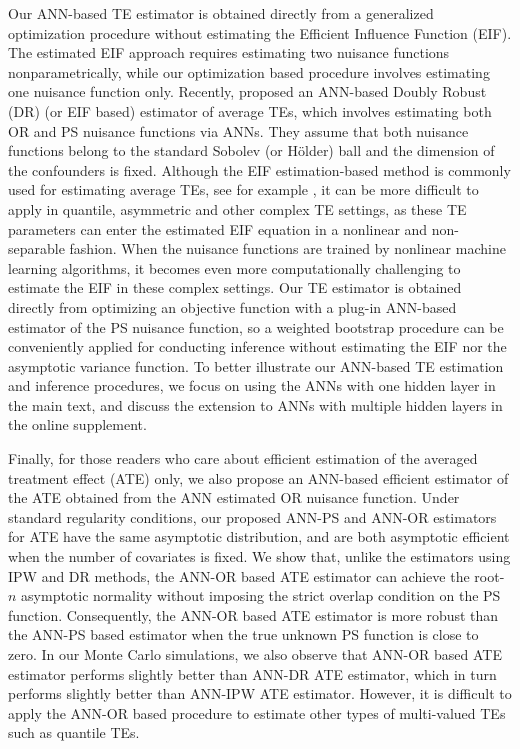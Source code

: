 \documentclass[11pt]{article}
\numberwithin{equation}{section}
\begin{document}
Our ANN-based TE estimator is obtained directly from a generalized optimization procedure without estimating the Efficient Influence Function (EIF). The estimated EIF approach requires estimating two nuisance functions nonparametrically, while our optimization based procedure involves estimating one nuisance function only. Recently, \cite{farrell2018deep} proposed an ANN-based Doubly Robust (DR) (or EIF based) estimator of average TEs, which involves estimating both OR and PS nuisance functions via ANNs. They assume that both nuisance functions belong to the standard Sobolev (or H\"{o}lder) ball and the dimension of the confounders is fixed. Although the EIF estimation-based method is commonly used for estimating average TEs, see for example \cite{CTD09, T10, VR11, RLSR12,KMMS17,chernozhukov2018double}, it can be more difficult to apply in quantile, asymmetric and other complex TE settings, as these TE parameters can enter the estimated EIF equation in a nonlinear and non-separable fashion. When the nuisance functions are trained by nonlinear machine learning algorithms, it becomes even more computationally challenging to estimate the EIF in these complex settings. Our TE estimator is obtained directly from optimizing an objective function with a plug-in ANN-based estimator of the PS nuisance function, so a weighted bootstrap procedure can be conveniently applied for conducting inference without estimating the EIF nor the asymptotic variance function. To better illustrate our ANN-based TE estimation and inference procedures, we focus on using the ANNs with one hidden layer in the main text, and discuss the extension to ANNs with multiple hidden layers in the online supplement.


Finally, for those readers who care about efficient estimation of the averaged treatment effect (ATE) only, we also propose an
ANN-based efficient estimator of the ATE obtained from the ANN estimated OR nuisance function. Under standard regularity conditions, our proposed ANN-PS and ANN-OR estimators for ATE have the same asymptotic distribution, and are both asymptotic efficient when the number of covariates is fixed. We show that, unlike the estimators using IPW and DR methods, the ANN-OR based ATE estimator can achieve the root-$n$ asymptotic normality without imposing the strict overlap condition on the PS function. Consequently, the ANN-OR based ATE estimator is more robust than the ANN-PS based estimator when the true unknown PS function is close to zero. In our Monte Carlo simulations, we also observe that ANN-OR based ATE estimator performs slightly better than ANN-DR ATE estimator, which in turn performs slightly better than ANN-IPW ATE estimator. However, it is difficult to apply the ANN-OR based procedure to estimate other types of multi-valued TEs such as quantile TEs.
\end{document}
